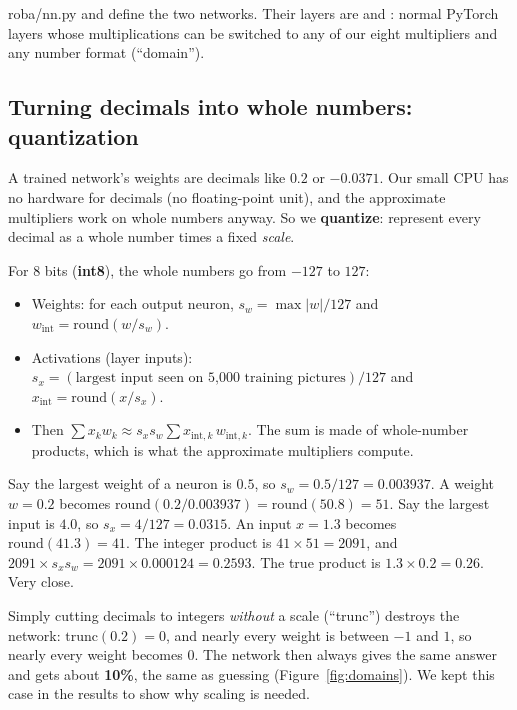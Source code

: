 \begin{inthecode}{roba/nn.py}
 and  define the two networks. Their layers are  and
: normal PyTorch layers whose multiplications can be switched to any of our eight
multipliers and any number format (``domain'').
\end{inthecode}

\subsection{Turning decimals into whole numbers: quantization}\label{sec:quant}

A trained network's weights are decimals like $0.2$ or $-0.0371$. Our small CPU has no hardware for
decimals (no floating-point unit), and the approximate multipliers work on whole numbers anyway. So we
\textbf{quantize}: represent every decimal as a whole number times a fixed \emph{scale}.

For 8 bits (\textbf{int8}), the whole numbers go from $-127$ to $127$:
\begin{itemize}
  \item Weights: for each output neuron, $s_w = \max|w| / 127$ and $w_{\text{int}} = \text{round}(w/s_w)$.
  \item Activations (layer inputs): $s_x = (\text{largest input seen on 5{,}000 training pictures})/127$
        and $x_{\text{int}} = \text{round}(x/s_x)$.
  \item Then $\sum x_k w_k \approx s_x s_w \sum x_{\text{int},k}\, w_{\text{int},k}$. The sum is
        made of whole-number products, which is what the approximate multipliers compute.
\end{itemize}

\begin{example}
Say the largest weight of a neuron is $0.5$, so $s_w = 0.5/127 = 0.003937$. A weight $w=0.2$ becomes
$\text{round}(0.2/0.003937) = \text{round}(50.8) = 51$.
Say the largest input is $4.0$, so $s_x = 4/127 = 0.0315$. An input $x=1.3$ becomes
$\text{round}(41.3) = 41$.
The integer product is $41\times 51 = 2091$, and $2091\times s_x s_w = 2091\times 0.000124 = 0.2593$.
The true product is $1.3\times0.2 = 0.26$. Very close.
\end{example}

\begin{careful}
Simply cutting decimals to integers \emph{without} a scale (``trunc'') destroys the network:
$\text{trunc}(0.2) = 0$, and nearly every weight is between $-1$ and $1$, so nearly every weight
becomes 0. The network then always gives the same answer and gets about \textbf{10\%}, the same as
guessing (Figure~\ref{fig:domains}). We kept this case in the results to show why scaling is needed.
\end{careful}

